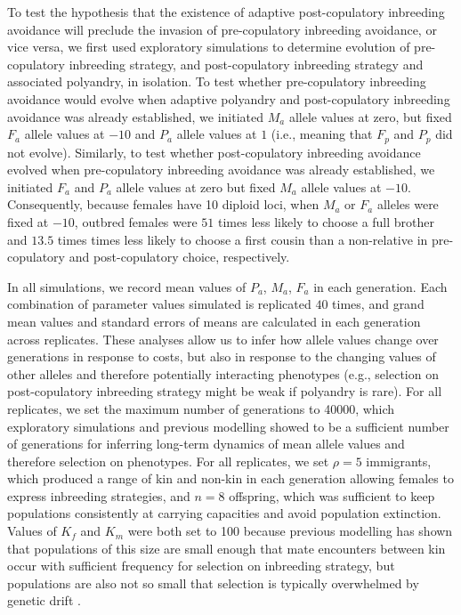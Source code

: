 \documentclass[10pt,letterpaper]{article}
\begin{document}
To test the hypothesis that the existence of adaptive post-copulatory inbreeding avoidance will preclude the invasion of pre-copulatory inbreeding avoidance, or vice versa, we first used exploratory simulations to determine evolution of pre-copulatory inbreeding strategy, and post-copulatory inbreeding strategy and associated polyandry, in isolation. To test whether pre-copulatory inbreeding avoidance would evolve when adaptive polyandry and post-copulatory inbreeding avoidance was already established, we initiated $M_{a}$ allele values at zero, but fixed $F_{a}$ allele values at $-10$ and $P_{a}$ allele values at $1$ (i.e., meaning that $F_{p}$ and $P_{p}$ did not evolve). Similarly, to test whether post-copulatory inbreeding avoidance evolved when pre-copulatory inbreeding avoidance was already established, we initiated $F_{a}$ and $P_{a}$ allele values at zero but fixed $M_{a}$ allele values at $-10$. Consequently, because females have 10 diploid loci, when $M_{a}$ or $F_{a}$ alleles were fixed at $-10$, outbred females were $51$ times less likely to choose a full brother and $13.5$ times times less likely to choose a first cousin than a non-relative in pre-copulatory and post-copulatory choice, respectively.


In all simulations, we record mean values of $P_{a}$, $M_{a}$, $F_{a}$ in each generation. Each combination of parameter values simulated is replicated $40$ times, and grand mean values and standard errors of means are calculated in each generation across replicates. These analyses allow us to infer how allele values change over generations in response to costs, but also in response to the changing values of other alleles and therefore potentially interacting phenotypes (e.g., selection on post-copulatory inbreeding strategy might be weak if polyandry is rare). For all replicates, we set the maximum number of generations to 40000, which exploratory simulations and previous modelling \cite[][]{Duthie} showed to be a sufficient number of generations for inferring long-term dynamics of mean allele values and therefore selection on phenotypes.  For all replicates, we set $\rho=5$ immigrants, which produced a range of kin and non-kin in each generation allowing females to express inbreeding strategies, and $n=8$ offspring, which was sufficient to keep populations consistently at carrying capacities and avoid population extinction. Values of $K_{f}$ and $K_{m}$ were both set to 100 because previous modelling has shown that populations of this size are small enough that mate encounters between kin occur with sufficient frequency for selection on inbreeding strategy, but populations are also not so small that selection is typically overwhelmed by genetic drift \cite[][]{Duthie2016a}.
\end{document}
